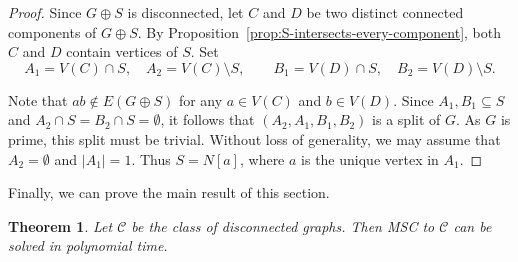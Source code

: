 \documentclass[11pt]{article}
\newtheorem{theorem}{Theorem}
\theoremstyle{definition}
\begin{document}
\begin{proof}
Since $G \oplus S$ is disconnected, let $C$ and $D$ be two distinct connected
components of $G \oplus S$.
By Proposition~\ref{prop:S-intersects-every-component}, both
$C$ and $D$ contain vertices of $S$.
Set
\[
A_1 = V(C)\cap S,\quad A_2 = V(C)\setminus S,\qquad
B_1 = V(D)\cap S,\quad B_2 = V(D)\setminus S .
\]

Note that $ab \notin E(G \oplus S)$ for any $a \in V(C)$ and $b \in V(D)$.
Since $A_1,B_1 \subseteq S$ and $A_2 \cap S = B_2 \cap S = \emptyset$,
it follows that $(A_2,A_1,B_1,B_2)$ is a split of $G$.
As $G$ is prime, this split must be trivial.
Without loss of generality, we may assume that $A_2 = \emptyset$ and $|A_1| = 1$.
Thus $S = N[a]$, where $a$ is the unique vertex in $A_1$.
\end{proof}

Finally, we can prove the main result of this section.

\begin{theorem}\label{thm:to-0conn}
Let $\mathcal{C}$ be the class of disconnected graphs.
Then MSC to $\mathcal{C}$ can be solved in polynomial time.
\end{theorem}
\end{document}
